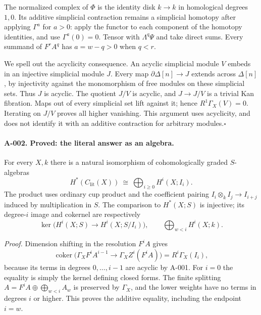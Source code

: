 The normalized complex of $\Phi$ is the identity disk $k\to k$ in
homological degrees $1,0$. Its additive simplicial contraction remains
a simplicial homotopy after applying $\Gamma^a$ for $a>0$: apply the
functor to each component of the homotopy identities, and use
$\Gamma^a(0)=0$. Tensor with $\Lambda^q\Psi$ and take direct sums.
Every summand of $F^rA^q$ has $a=w-q>0$ when $q<r$.

We spell out the acyclicity consequence. An acyclic simplicial module
$V$ embeds in an injective simplicial module $J$. Every map
$\partial\Delta[n]\to J$ extends across $\Delta[n]$, by injectivity
against the monomorphism of free modules on these simplicial sets.
Thus $J$ is acyclic. The quotient $J/V$ is acyclic, and $J\to J/V$
is a trivial Kan fibration. Maps out of every simplicial set lift
against it; hence $R^1\Gamma_X(V)=0$. Iterating on $J/V$ proves all
higher vanishing. This argument uses acyclicity, and does not identify
it with an additive contraction for arbitrary modules.\hfill$\square$

\paragraph{A-002. Proved: the literal answer as an algebra.}
For every $X,k$ there is a natural isomorphism of cohomologically graded
$S$-algebras
\[
 H^*(C_{\mathrm{lit}}(X))\ \cong\
 \bigoplus_{i\geq0}H^i(X;I_i).
 \tag{A-1}\label{eq:literal}
\]
The product uses ordinary cup product and the coefficient pairing
$I_i\otimes_k I_j\to I_{i+j}$ induced by multiplication in $S$.
The comparison to $H^*(X;S)$ is injective; its degree-$i$ image and
cokernel are respectively
\[
 \ker\bigl(H^i(X;S)\to H^i(X;S/I_i)\bigr),
 \qquad \bigoplus_{w<i}H^i(X;k).
\]

\emph{Proof.}
Dimension shifting in the resolution $F^iA$ gives
\[
 \operatorname{coker}\bigl(\Gamma_XF^iA^{i-1}\to
                   \Gamma_X Z^i(F^iA)\bigr)=R^i\Gamma_X(I_i),
\]
because its terms in degrees $0,\ldots,i-1$ are acyclic by A-001.
For $i=0$ the equality is simply the kernel defining closed forms.
The finite splitting $A=F^iA\oplus\bigoplus_{w<i}A_w$ is preserved
by $\Gamma_X$, and the lower weights have no terms in degrees
$i$ or higher. This proves the additive equality, including the
endpoint $i=w$.

